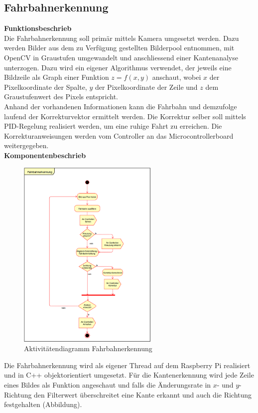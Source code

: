 \subsection{Fahrbahnerkennung}
\textbf{Funktionsbeschrieb}\\[0.2cm]
Die Fahrbahnerkennung soll primär mittels Kamera umgesetzt werden. Dazu werden Bilder aus dem zu Verfügung gestellten Bilderpool entnommen, mit OpenCV in Graustufen umgewandelt und anschliessend einer Kantenanalyse unterzogen. Dazu wird ein eigener Algorithmus verwendet, der jeweils eine Bildzeile als Graph einer Funktion $z = f(x,y)$ anschaut, wobei $x$ der Pixelkoordinate der Spalte, $y$ der Pixelkoordinate der Zeile und $z$ dem Graustufenwert des Pixels entspricht.\\
Anhand der vorhandenen Informationen kann die Fahrbahn und demzufolge laufend der Korrekturvektor ermittelt werden. Die Korrektur selber soll mittels PID-Regelung realisiert werden, um eine ruhige Fahrt zu erreichen. Die Korrekturanweisungen werden vom Controller an das Microcontrollerboard weitergegeben.\\[0.2cm]
\textbf{Komponentenbeschrieb}
\begin{figure}[H]%
\centering
\includegraphics[width=0.6\textwidth]{03_Loesungskonzept/pictures/Fahrbahnerkennung.png}
\caption{Aktivitätendiagramm Fahrbahnerkennung}
\label{fig:activityRoute}
\end{figure}
Die Fahrbahnerkennung wird als eigener Thread auf dem Raspberry Pi realisiert und in C++ objektorientiert umgesetzt. Für die Kantenerkennung wird jede Zeile eines Bildes als Funktion angeschaut und falls die Änderungsrate in $x$- und $y$-Richtung den Filterwert überschreitet eine Kante erkannt und auch die Richtung festgehalten (Abbildung).\\
